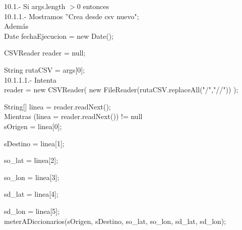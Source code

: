 \documentclass[30pt]{article}
\theoremstyle{definition}
\begin{document}
    \hspace{2cm} 10.1.- Si args.length $>$0 entonces \\
    
    \hspace{3cm} 10.1.1.- Mostramos ''Crea desde csv nuevo";\\
    
    \hspace{3cm} Además\\
    
    \hspace{3cm} Date fechaEjecucion = new Date();
    
    \hspace{3cm} CSVReader reader = null;
    
    \hspace{3cm} String rutaCSV = args[0];\\
    
    \hspace{4cm} 10.1.1.1.- Intenta \\
    
    \hspace{4cm} reader = new CSVReader( new FileReader(rutaCSV.replaceAll("/","//")) );

    \hspace{4cm} String[] linea = reader.readNext();\\
    
    \hspace{5cm} Mientras (linea = reader.readNext()) != null \\
    
    \hspace{5cm} sOrigen  = linea[0];
    
  \hspace{5cm} sDestino  = linea[1];
  
  \hspace{5cm} so\_lat  = linea[2];
  
  \hspace{5cm} so\_lon  = linea[3];
  
  \hspace{5cm} sd\_lat  = linea[4];
  
  \hspace{5cm} sd\_lon  = linea[5];\\

  \hspace{5cm} meterADiccionarios(sOrigen, sDestino, so\_lat, so\_lon, sd\_lat, sd\_lon);\\
  
\end{document}

